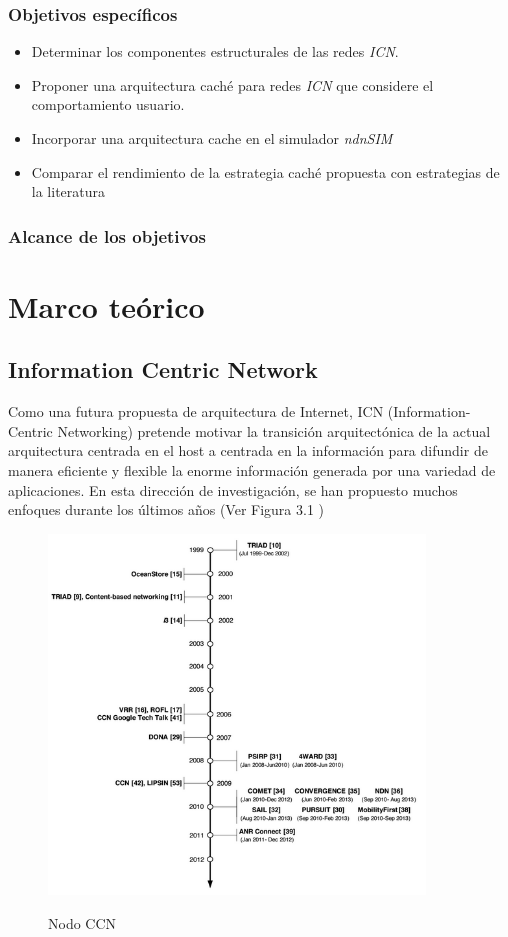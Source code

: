 \documentclass[12pt]{ociamthesis}  %
\begin{document}
\subsection{Objetivos específicos}
\begin{itemize}
	\item Determinar los componentes estructurales de las redes \textit{ICN}.
	\item Proponer una arquitectura caché para redes \textit{ICN} que considere el comportamiento usuario.
	\item Incorporar una arquitectura cache en el simulador \textit{ndnSIM}
	\item Comparar el rendimiento de la estrategia caché propuesta con estrategias de la literatura
\end{itemize}

\subsection{Alcance de los objetivos}

\chapter{Marco teórico}
\section{Information Centric Network}

Como una futura propuesta de arquitectura de Internet, ICN (Information-Centric Networking) pretende motivar la transición arquitectónica de la actual arquitectura centrada en el host a centrada en la información para difundir de manera eficiente y flexible la enorme información generada por una variedad de aplicaciones. En esta dirección de investigación, se han propuesto muchos enfoques durante los últimos años (Ver Figura 3.1 )

	\begin{figure}[h]
		\centering
		\includegraphics[width=10cm]{Linea_Temporal_ICN.png}\\
		\caption{Nodo CCN}
		\label{fig:mesh1}
	\end{figure}
\end{document}
